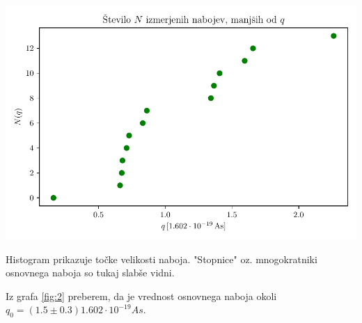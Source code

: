 \documentclass[12pt]{report}
\begin{document}
\begin{slika}[H]
  \centering
  \includegraphics{2metoda.pdf}
  \caption{\small Histogram prikazuje točke velikosti naboja. "Stopnice" oz. mnogokratniki osnovnega naboja so tukaj slabše vidni.}
  \label{fig:2}
\end{slika}

Iz grafa \ref{fig:2} preberem, da je vrednost osnovnega naboja okoli $q_0 = (1.5 \pm 0.3) 1.602 \cdot 10^{-19}As$. 
\end{document}
